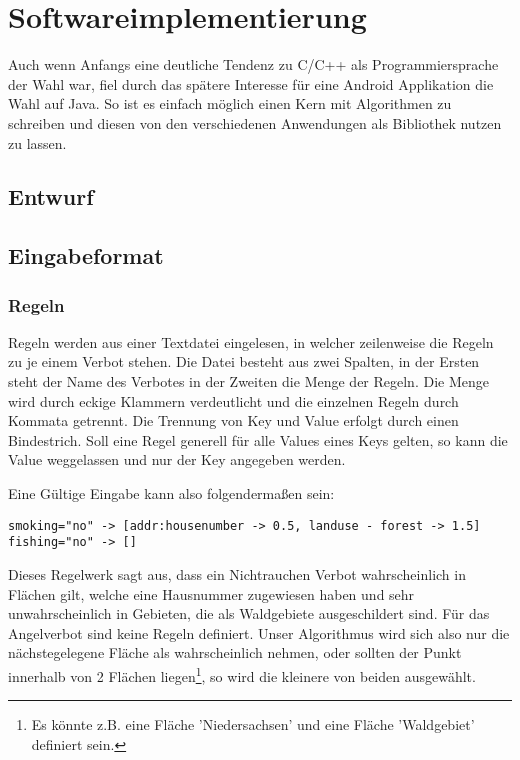 \section{Softwareimplementierung}
Auch wenn Anfangs eine deutliche Tendenz zu C/C++ als Programmiersprache der Wahl war, fiel durch das spätere Interesse für eine
Android Applikation die Wahl auf Java. So ist es einfach möglich einen Kern mit Algorithmen zu schreiben und diesen von den
verschiedenen Anwendungen als Bibliothek nutzen zu lassen.

\subsection{Entwurf}


\subsection{Eingabeformat}
\subsubsection{Regeln}
\label{sec:Eingabedaten_Wir}
Regeln werden aus einer Textdatei eingelesen, in welcher zeilenweise die Regeln zu je einem Verbot stehen.
Die Datei besteht aus zwei Spalten, in der Ersten steht der Name des Verbotes in der Zweiten die Menge der Regeln.
Die Menge wird durch eckige Klammern verdeutlicht und die einzelnen Regeln durch Kommata getrennt.
Die Trennung von Key und Value erfolgt durch einen Bindestrich.
Soll eine Regel generell für alle Values eines Keys gelten, so kann die Value weggelassen und nur der Key angegeben werden.

Eine Gültige Eingabe kann also folgendermaßen sein:
\begin{lstlisting}[frame=single]
smoking="no" -> [addr:housenumber -> 0.5, landuse - forest -> 1.5]
fishing="no" -> []
\end{lstlisting}
Dieses Regelwerk sagt aus, dass ein Nichtrauchen Verbot wahrscheinlich in Flächen gilt, welche eine Hausnummer zugewiesen haben
und sehr unwahrscheinlich in Gebieten, die als Waldgebiete ausgeschildert sind.
Für das Angelverbot sind keine Regeln definiert. Unser Algorithmus wird sich also nur die nächstegelegene Fläche als wahrscheinlich nehmen,
oder sollten der Punkt innerhalb von 2 Flächen liegen\footnote{Es könnte z.B. eine Fläche 'Niedersachsen' und eine Fläche 'Waldgebiet' definiert sein.},
so wird die kleinere von beiden ausgewählt.

